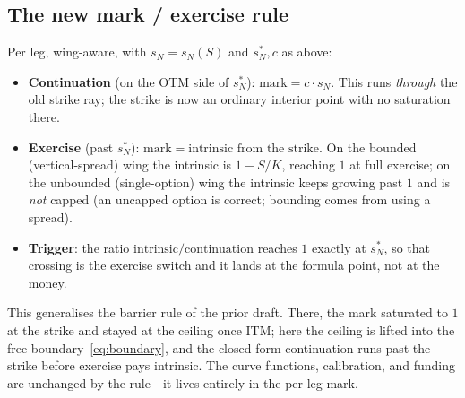 \documentclass[runningheads]{llncs}
\begin{document}
\subsection{The new mark / exercise rule}
Per leg, wing-aware, with $s_{N}=s_{N}(S)$ and $s_{N}^{\ast},c$ as above:
\begin{itemize}[leftmargin=2em]
  \item \textbf{Continuation} (on the OTM side of $s_{N}^{\ast}$):
        $\mathrm{mark}=c\cdot s_{N}$. This runs \emph{through} the old strike ray;
        the strike is now an ordinary interior point with no saturation there.
  \item \textbf{Exercise} (past $s_{N}^{\ast}$): $\mathrm{mark}=\text{intrinsic
        from the strike}$. On the bounded (vertical-spread) wing the intrinsic is
        $1-S/K$, reaching $1$ at full exercise; on the unbounded (single-option)
        wing the intrinsic keeps growing past $1$ and is \emph{not} capped (an
        uncapped option is correct; bounding comes from using a spread).
  \item \textbf{Trigger}: the ratio $\text{intrinsic}/\text{continuation}$ reaches
        $1$ exactly at $s_{N}^{\ast}$, so that crossing is the exercise switch and
        it lands at the formula point, not at the money.
\end{itemize}
This generalises the barrier rule of the prior draft. There, the mark saturated
to $1$ at the strike and stayed at the ceiling once ITM; here the ceiling is
lifted into the free boundary~\eqref{eq:boundary}, and the closed-form
continuation runs past the strike before exercise pays intrinsic. The curve
functions, calibration, and funding are unchanged by the rule---it lives entirely
in the per-leg mark.
\end{document}
